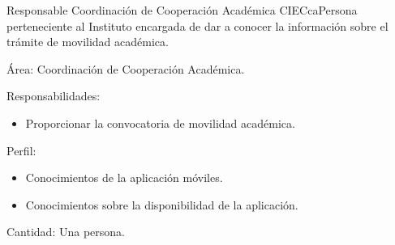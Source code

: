 \begin{actor}{Responsable Coordinación de Cooperación Académica }{CIECca}{Persona perteneciente al Instituto encargada de dar a conocer la información sobre el trámite de movilidad académica.}
	
	\item[Área:] Coordinación de Cooperación Académica.
	\item[Responsabilidades:] \hspace{1pt}
	
	\begin{itemize}
		
		\item Proporcionar la convocatoria de movilidad académica.
	
	\end{itemize}
	
	\item[Perfil:] \hspace{1pt}
	
	\begin{itemize}
		
		\item Conocimientos de la aplicación móviles.
		\item Conocimientos sobre la disponibilidad de la aplicación.	
	\end{itemize}
	
	\item[Cantidad:] Una persona.
	
\end{actor}

